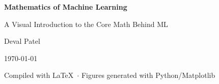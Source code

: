 \documentclass[11pt,a4paper]{report}
\begin{document}
\begin{titlepage}
  \centering
  \vspace*{2cm}
  {\Huge\bfseries\color{accent} Mathematics of Machine Learning\par}
  \vspace{0.5cm}
  {\Large A Visual Introduction to the Core Math Behind ML\par}
  \vspace{2cm}
  {\large Deval Patel\par}
  \vspace{0.3cm}
  {\large \today\par}
  \vfill
  {\small Compiled with \LaTeX\ \(\cdot\) Figures generated with Python/Matplotlib\par}
\end{titlepage}

\tableofcontents






\end{document}

